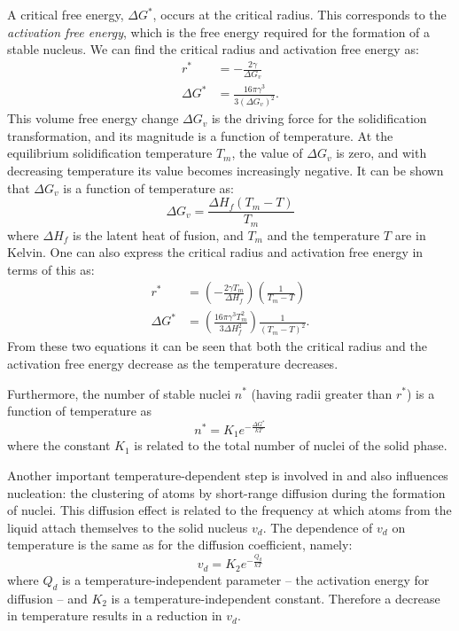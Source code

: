 A critical free energy, $\Delta G^{*}$, occurs at the critical radius. This corresponds to the \textit{activation free energy}, which is the free energy required for the formation of a stable nucleus. We can find the critical radius and activation free energy as:
\begin{align*}
  r^{*} &= - \frac{2\gamma}{\Delta G_v} \\
  \Delta G^{*} &= \frac{16\pi \gamma^3}{3 \left( \Delta G_v \right)^2}
.\end{align*}
This volume free energy change $\Delta G_v$ is the driving force for the solidification transformation, and its magnitude is a function of temperature. At the equilibrium solidification temperature $T_m$, the value of $\Delta G_v$ is zero, and with decreasing temperature its value becomes increasingly negative. It can be shown that $\Delta G_v$ is a function of temperature as:
\[ 
\Delta G_v = \frac{\Delta H_f \left( T_m - T \right) }{T_m}
\]
where $\Delta H_f$ is the latent heat of fusion, and $T_m$ and the temperature $T$ are in Kelvin. One can also express the critical radius and activation free energy in terms of this as:
\begin{align*}
  r^{*} &= \left( - \frac{2\gamma T_m}{\Delta H_f} \right) \left( \frac{1}{T_m - T} \right)  \\
  \Delta G^{*} &= \left( \frac{16 \pi \gamma^3 T_m^2}{3 \Delta H_f^2} \right) \frac{1}{\left( T_m - T \right)^2}
.\end{align*}
From these two equations it can be seen that both the critical radius and the activation free energy decrease as the temperature decreases. 

Furthermore, the number of stable nuclei $n^{*}$ (having radii greater than $r^{*}$) is a function of temperature as
\[ 
n^{*} = K_1 e^{- \frac{\Delta G^{*}}{kT}}
\]
where the constant $K_1$ is related to the total number of nuclei of the solid phase.

Another important temperature-dependent step is involved in and also influences nucleation: the clustering of atoms by short-range diffusion during the formation of nuclei. This diffusion effect is related to the frequency at which atoms from the liquid attach themselves to the solid nucleus $v_d$. The dependence of $v_d$ on temperature is the same as for the diffusion coefficient, namely:
\[ 
v_d = K_2 e^{-\frac{Q_d}{kT}}
\]
where $Q_d$ is a temperature-independent parameter -- the activation energy for diffusion -- and $K_2$ is a temperature-independent constant. Therefore a decrease in temperature results in a reduction in $v_d$. 

